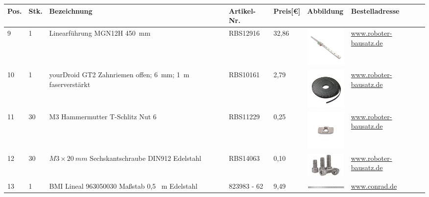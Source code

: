 \begin{center}
		\fontsize{8}{10}\selectfont
		\begin{tabularx}{\textwidth}{|p{0.4cm}|p{0.4cm}|X|X|p{1cm}|X|X|}
		\hline 
		\textbf{Pos.} & \textbf{Stk.} & \textbf{Bezeichnung} & \textbf{Artikel-Nr.}& \textbf{Preis[€]} & \textbf{Abbildung} & \textbf{Bestelladresse} \\ \hline	
		9 & 1 & Linearführung MGN12H 450\ mm & RBS12916 & 32,86  &  \includegraphics[width=2cm]{Images/Material/RBS12916.jpg} & \href{https://www.roboter-bausatz.de/p/linearfuehrung-mgn12h-450mm}{www.roboter-bausatz.de} \\
		\hline			
		10 & 1 & yourDroid GT2 Zahnriemen offen; 6\ mm; 1\ m faserverstärkt & RBS10161 & 2,79  & \includegraphics[width=2cm]{Images/Material/RBS10161.jpg} & \href{https://www.roboter-bausatz.de/p/yourdroid-gt2-zahnriemen-offen-6mm-1-meter-faserverstaerkt}{www.roboter-bausatz.de} \\
		\hline
		11 & 30 & M3 Hammermutter T-Schlitz Nut 6 &  RBS11229 & 0,25   & \includegraphics[width=2cm]{Images/Material/RBS11229.jpg} & \href{https://www.roboter-bausatz.de/p/m3-hammermutter-t-schlitz-nut-6}{www.roboter-bausatz.de} \\
		\hline
		12 & 30 & $M3 \times 20 \ mm$ Sechskantschraube DIN912 Edelstahl & RBS14063 & 0,10  & \includegraphics[width=2cm]{Images/Material/DIN912M3x20.jpg} &
		\href{https://www.roboter-bausatz.de/p/m3x20mm-sechskantschraube-din912-edelstahl}{www.roboter-bausatz.de} \\
		\hline
		13 & 1 & BMI Lineal 963050030 Maßstab 0,5 \ m Edelstahl & 823983 - 62 & 9,49  & \includegraphics[width=2cm]{Images/Material/Linieal.png} & \href{https://www.conrad.de/de/p/bmi-lineal-963050030-massstab-0-5-m-edelstahl-823983.html}{www.conrad.de} \\

\end{tabularx}
\end{center}
